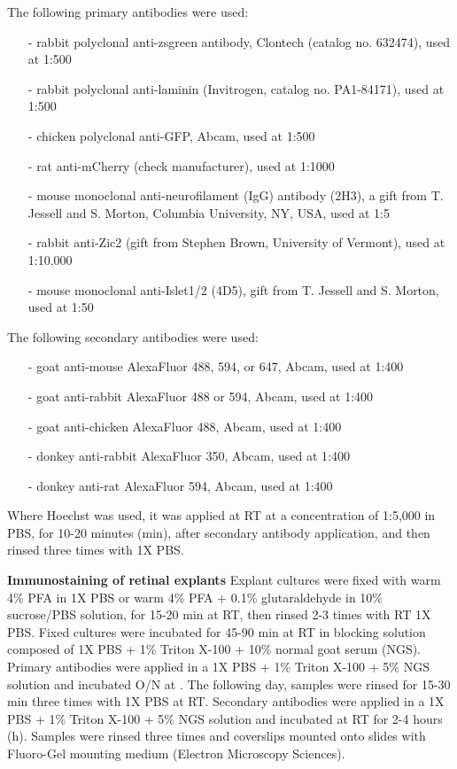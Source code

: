The following primary antibodies were used:
\begin{itemize}
	\item[-] rabbit polyclonal anti-zsgreen antibody, Clontech (catalog no. 632474), used at 1:500
	\item[-] rabbit polyclonal anti-laminin (Invitrogen, catalog no. PA1-84171), used at 1:500
	\item[-] chicken polyclonal anti-GFP, Abcam, used at 1:500
	\item[-] rat anti-mCherry (check manufacturer), used at 1:1000
	\item[-] mouse monoclonal anti-neurofilament (IgG) antibody (2H3), a gift from T. Jessell and S. Morton, Columbia University, NY, USA, used at 1:5
	\item[-] rabbit anti-Zic2 (gift from Stephen Brown, University of Vermont), used at 1:10,000
	\item[-] mouse monoclonal anti-Islet1/2 (4D5), gift from T. Jessell and S. Morton, used at 1:50
\end{itemize}

The following secondary antibodies were used:
\begin{itemize}
	\item[-] goat anti-mouse AlexaFluor 488, 594, or 647, Abcam, used at 1:400
	\item[-] goat anti-rabbit AlexaFluor 488 or 594, Abcam, used at 1:400
	\item[-] goat anti-chicken AlexaFluor 488, Abcam, used at 1:400
	\item[-] donkey anti-rabbit AlexaFluor 350, Abcam, used at 1:400
	\item[-] donkey anti-rat AlexaFluor 594, Abcam, used at 1:400
\end{itemize}
Where Hoechst was used, it was applied at RT at a concentration of 1:5,000 in PBS, for 10-20 minutes (min), after secondary antibody application, and then rinsed three times with 1X PBS.

\textbf{Immunostaining of retinal explants} \newline
Explant cultures were fixed with warm 4\% PFA in 1X PBS or warm 4\% PFA + 0.1\% glutaraldehyde in 10\% sucrose/PBS solution, for 15-20 min at RT, then rinsed 2-3 times with RT 1X PBS.
Fixed cultures were incubated for 45-90 min at RT in blocking solution composed of 1X PBS + 1\% Triton X-100 + 10\% normal goat serum (NGS).
Primary antibodies were applied in a 1X PBS + 1\% Triton X-100 + 5\% NGS solution and incubated O/N at .
The following day, samples were rinsed for 15-30 min three times with 1X PBS at RT.
Secondary antibodies were applied in a 1X PBS + 1\% Triton X-100 + 5\% NGS solution and incubated at RT for 2-4 hours (h).
Samples were rinsed three times and coverslips mounted onto slides with Fluoro-Gel mounting medium (Electron Microscopy Sciences).

